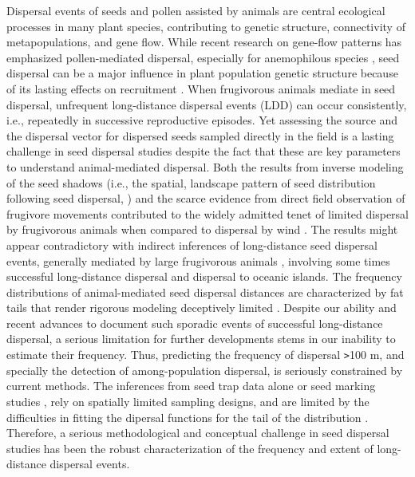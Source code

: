\documentclass[a4paper,12pt]{article}
\begin{document}
\begin{bibunit}[science]
\begin{linenumbers}
\begin{spacing}{2}
Dispersal events of seeds and pollen assisted by animals are central ecological processes in many plant species, contributing to genetic structure, connectivity of metapopulations, and gene flow. While recent research on gene-flow patterns has emphasized pollen-mediated dispersal, especially for anemophilous species \citep{Ennos:2001ii,Sork:1999}, seed dispersal can be a major influence in plant population genetic structure because of its lasting effects on recruitment \citep{Ouborg:1999}. When frugivorous animals mediate in seed dispersal, unfrequent long-distance dispersal events (LDD) can occur consistently, i.e., repeatedly in successive reproductive episodes. Yet assessing the source and the dispersal vector for dispersed seeds sampled directly in the field is a lasting challenge in seed dispersal studies \citep{Nathan:2006qy} despite the fact that these are key parameters to understand animal-mediated dispersal. Both the results from inverse modeling \citep{Clark:1999sv} of the seed shadows (i.e., the spatial, landscape pattern of seed distribution following seed dispersal, \citep{Sork:1999}) and the scarce evidence from direct field observation of frugivore movements contributed to the widely admitted tenet of limited dispersal by frugivorous animals when compared to dispersal by wind \citep{Oddou-Muratorio:2001}. The results might appear contradictory with indirect inferences of long-distance seed dispersal events, generally mediated by  large frugivorous animals \citep{Fragoso:1997,Holbrook:2002fk,Holbrook:2006uq,Westcott:2000}, involving some times successful long-distance dispersal and dispersal to oceanic islands. The frequency distributions of animal-mediated seed dispersal distances are characterized by fat tails that render rigorous modeling deceptively limited \citep{Jordano:2007,Jordano:2007a,Nathan:2006qy}. Despite our ability and recent advances \citep{Godoy:2001,Garcia:2006,Jordano:2007,Hardesty:2006lr,Jones:2005fk_E31.7321} to document such sporadic events of successful long-distance dispersal, a serious limitation for further developments stems in our inability to estimate their frequency. Thus, predicting the frequency of dispersal \texttt{>}100 m, and specially the detection of among-population dispersal, is seriously  constrained by current methods. The inferences from seed trap  data alone \citep{Clark:1999sv} or seed marking studies \citep{Levey_etal_E31_7300}, rely on spatially limited sampling designs, and are limited by the difficulties in fitting the dipersal functions for the tail of the distribution \citep{Nathan:2003qe,Jordano:2007a}. Therefore, a serious methodological and conceptual challenge in seed dispersal studies has been the robust characterization of the frequency and extent of long-distance dispersal events.


\end{spacing}
\end{linenumbers}
\end{bibunit}
\end{document}
